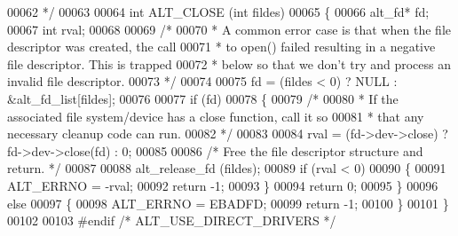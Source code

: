 \begin{DoxyCode}
00062 \textcolor{comment}{ */}
00063  
00064 \textcolor{keywordtype}{int} ALT_CLOSE (\textcolor{keywordtype}{int} fildes)
00065 \{
00066   alt_fd* fd;
00067   \textcolor{keywordtype}{int}     rval;
00068 
00069   \textcolor{comment}{/*}
00070 \textcolor{comment}{   * A common error case is that when the file descriptor was created, the call}
00071 \textcolor{comment}{   * to open() failed resulting in a negative file descriptor. This is trapped}
00072 \textcolor{comment}{   * below so that we don't try and process an invalid file descriptor.}
00073 \textcolor{comment}{   */}
00074 
00075   fd = (fildes < 0) ? NULL : &alt_fd_list[fildes];
00076 
00077   \textcolor{keywordflow}{if} (fd)
00078   \{
00079     \textcolor{comment}{/*}
00080 \textcolor{comment}{     * If the associated file system/device has a close function, call it so }
00081 \textcolor{comment}{     * that any necessary cleanup code can run.}
00082 \textcolor{comment}{     */}
00083 
00084     rval = (fd->dev->close) ? fd->dev->close(fd) : 0;
00085 
00086     \textcolor{comment}{/* Free the file descriptor structure and return. */}
00087 
00088     alt_release_fd (fildes);
00089     \textcolor{keywordflow}{if} (rval < 0)
00090     \{
00091       ALT_ERRNO = -rval;
00092       \textcolor{keywordflow}{return} -1;
00093     \}
00094     \textcolor{keywordflow}{return} 0;
00095   \}
00096   \textcolor{keywordflow}{else}
00097   \{
00098     ALT_ERRNO = EBADFD;
00099     \textcolor{keywordflow}{return} -1;
00100   \}
00101 \}
00102 
00103 \textcolor{preprocessor}{#endif }\textcolor{comment}{/* ALT\_USE\_DIRECT\_DRIVERS */}\textcolor{preprocessor}{}
\end{DoxyCode}
